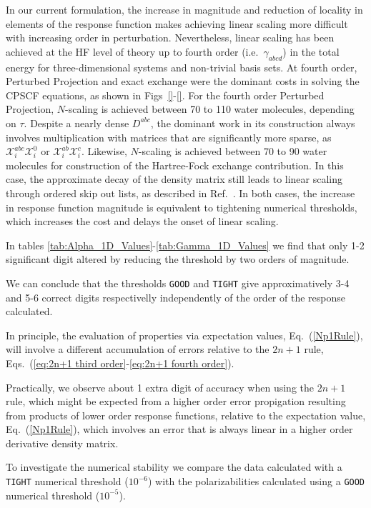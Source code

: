 \documentclass[prl,aps,letterpaper,twocolumn,showpacs,twocolumngrid,superbib]{revtex4}
\def\X{\mathcal{X}}
\begin{document}
In our current formulation, the increase in magnitude and reduction of locality in elements of the 
response function makes achieving linear scaling more difficult with increasing order in perturbation. 
Nevertheless, linear scaling has been achieved at the HF level of theory up to fourth order (i.e.~$\gamma_{abcd}$) 
in the total energy for three-dimensional systems and  non-trivial basis sets.  At fourth order,
Perturbed Projection and exact exchange were the dominant costs in solving the CPSCF equations,
as shown in Figs~\ref{}-\ref{}.  For the fourth order Perturbed Projection, $N$-scaling is achieved 
between 70 to 110 water molecules, depending on $\tau$.  Despite a nearly dense $D^{abc}$, the 
dominant work in its construction always involves multiplication with matrices that are significantly 
more sparse, as $\X^{abc}_i\X^{0}_i$ or $\X^{ab}_i\X^{c}_i$.   Likewise, $N$-scaling is achieved between 
70 to 90 water molecules for construction of the Hartree-Fock exchange contribution.  In this case, 
the approximate decay of the density matrix still leads to linear scaling through ordered skip out lists,
as described in Ref.~.  In both cases, the increase in response function magnitude
is equivalent to tightening numerical thresholds, which increases the cost and delays the onset of linear
scaling. 

In tables \ref{tab:Alpha_1D_Values}-\ref{tab:Gamma_1D_Values} we find that
only 1-2 significant digit altered by reducing the threshold by two orders 
of magnitude. 

We can conclude that the thresholds 
{\tt GOOD} and {\tt TIGHT} give approximatively 3-4 and 5-6 
correct digits respectivelly independently of the order of the response calculated.


In principle, the evaluation of properties via expectation values, Eq.~(\ref{Np1Rule}), will involve
a different accumulation of errors relative to the $2n+1$ rule, 
Eqs.~(\ref{eq:2n+1 third order}-\ref{eq:2n+1 fourth order}).  


Practically, we observe about 1 extra digit of accuracy when using the $2n+1$ rule, which might
be expected from a higher order error propigation resulting from products of lower order response 
functions, relative to the expectation value, Eq.~(\ref{Np1Rule}), which involves an error that is always 
linear in a higher order derivative density matrix.





To investigate the numerical stability we compare the data calculated
with a {\tt TIGHT} numerical threshold ($10^{-6}$) with the polarizabilities
calculated using a {\tt GOOD} numerical threshold ($10^{-5}$). 
\end{document}
